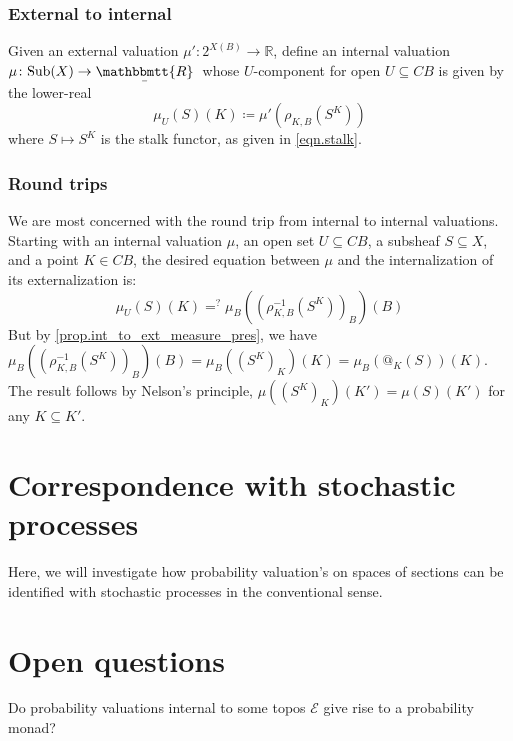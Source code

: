 \documentclass[11pt, oneside, article]{memoir}
\makeatletter
\theoremstyle{plain}
\theoremstyle{definition}
\theoremstyle{remark}
\renewcommand{\ss}{\subseteq}
\newcommand{\Set}[1]{\mathrm{#1}}
\newcommand{\cat}[1]{\mathcal{#1}}
\newcommand{\ubar}[1]{\underaccent{\bar}{#1}}
\newcommand{\internal}[1]{\raisebox{-.03ex}{$\mathbbmtt{#1}$}}
\newcommand{\hs}{\hspace{1.1pt}}
\newcommand{\RR}{\mathbb{R}}
\newcommand{\tRR}{\internal{R}\hs}
\newcommand{\tLR}{\ubar{\tRR}\hs}
\newcommand{\Sub}{\Set{Sub}}
\newcommand{\inv}{^{-1}}
\newcommand{\AtSymbol}{{@}}
\newcommand{\At}[2][]{\AtSymbol^{#1}_{#2}}
\makeatother
\begin{document}
\subsection{External to internal}
Given an external valuation $\mu'\colon 2^{X(B)}\to\RR$, define an internal valuation $\mu\colon\Sub(X)\to\tLR$ whose $U$-component for open $U\ss CB$ is given by the lower-real
\[\mu_U(S)(K)\coloneqq\mu'(\rho_{K,B}(S^K))\]
where $S\mapsto S^K$ is the stalk functor, as given in \cref{eqn.stalk}.


\subsection{Round trips}
We are most concerned with the round trip from internal to internal valuations. Starting with an internal valuation $\mu$, an open set $U\ss CB$, a subsheaf $S\ss X$, and a point $K\in CB$, the desired equation between $\mu$ and the internalization of its externalization is:
\[
\mu_U(S)(K)=^?\mu_B((\rho_{K,B}\inv(S^K))_B)(B)
\]
But by \cref{prop.int_to_ext_measure_pres}, we have $\mu_B((\rho_{K,B}\inv(S^K))_B)(B)=\mu_B((S^K)_K)(K)=\mu_B(\At{K}(S))(K)$. The result follows by Nelson's principle, $\mu((S^K)_K)(K')=\mu(S)(K')$ for any $K\ss K'$.



















\chapter{Correspondence with stochastic processes}

Here, we will investigate how probability valuation's on spaces of sections can be identified with stochastic processes in the conventional sense.

\chapter{Open questions}

Do probability valuations internal to some topos $\cat{E}$ give rise to a probability monad?



\newpage

\appendix
\end{document}
